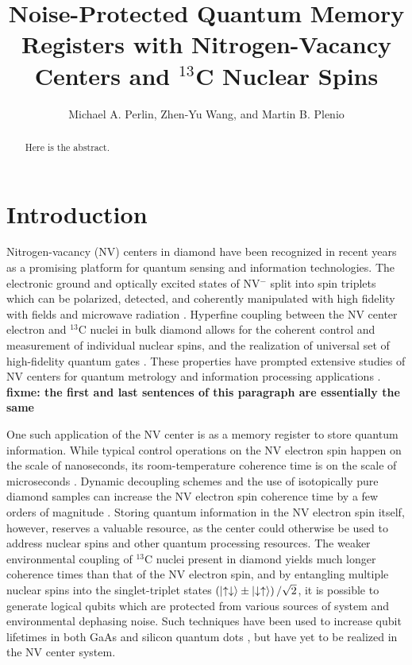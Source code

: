 \documentclass[twocolumn]{revtex4}
\newcommand{\p}[1]{\left(#1\right)} %
\renewcommand{\u}{\uparrow}
\renewcommand{\d}{\downarrow}
\newcommand{\fixme}[1]{{\bf \color{red} fixme: #1}}
\begin{document}
\title{Noise-Protected Quantum Memory Registers with Nitrogen-Vacancy
  Centers and $^{13}$C Nuclear Spins}

\author{Michael A. Perlin, Zhen-Yu Wang, and Martin B. Plenio}


\begin{abstract}
  Here is the abstract.
\end{abstract}

\maketitle

\section{Introduction}

Nitrogen-vacancy (NV) centers in diamond have been recognized in
recent years as a promising platform for quantum sensing and
information technologies. The electronic ground and optically excited
states of NV$^-$ split into spin triplets which can be polarized,
detected, and coherently manipulated with high fidelity with fields
and microwave radiation \cite{dobrovitski2013quantum}. Hyperfine
coupling between the NV center electron and $^{13}$C nuclei in bulk
diamond allows for the coherent control and measurement of individual
nuclear spins, and the realization of universal set of high-fidelity
quantum gates \cite{dobrovitski2013quantum, casanova2016noise}. These
properties have prompted extensive studies of NV centers for quantum
metrology and information processing applications
\cite{mamin2013nanoscale, steinert2010high, wang2015positioning,
  chou2015optimal, childress2006fault, yao2012scalable}. \fixme{the
  first and last sentences of this paragraph are essentially the same}

One such application of the NV center is as a memory register to store
quantum information. While typical control operations on the NV
electron spin happen on the scale of nanoseconds, its room-temperature
coherence time is on the scale of microseconds
\cite{dobrovitski2013quantum}. Dynamic decoupling schemes and the use
of isotopically pure diamond samples can increase the NV electron spin
coherence time by a few orders of magnitude
\cite{ryan2010robust}. Storing quantum information in the NV electron
spin itself, however, reserves a valuable resource, as the center
could otherwise be used to address nuclear spins and other quantum
processing resources. The weaker environmental coupling of $^{13}$C
nuclei present in diamond yields much longer coherence times than that
of the NV electron spin, and by entangling multiple nuclear spins into
the singlet-triplet states $\p{\ket{\u\d}\pm\ket{\d\u}}/\sqrt2$, it is
possible to generate logical qubits which are protected from various
sources of system and environmental dephasing noise. Such techniques
have been used to increase qubit lifetimes in both GaAs and silicon
quantum dots \cite{bluhm2011dephasing, maune2012coherent}, but have
yet to be realized in the NV center system.
\end{document}
